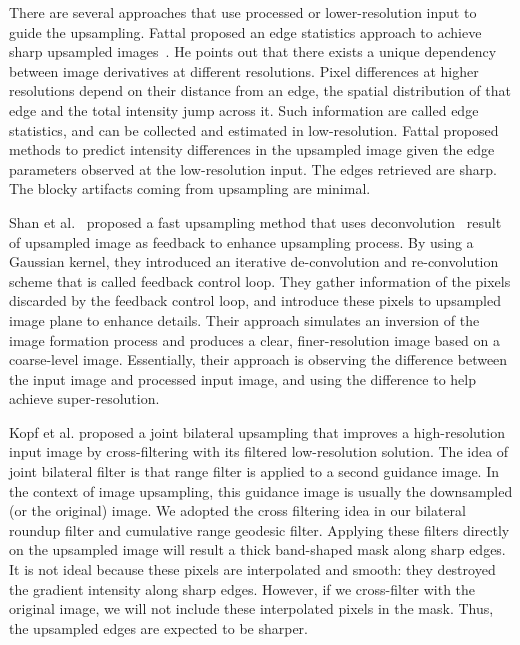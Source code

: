 There are several approaches that use processed or lower-resolution input to guide the upsampling. Fattal proposed an edge statistics approach to achieve sharp upsampled images~\cite{FAT:EdgeStatistics}. He points out that there exists a unique dependency between image derivatives at different resolutions. Pixel differences at higher resolutions depend on their distance from an edge, the spatial distribution of that edge and the total intensity jump across it. Such information are called edge statistics, and can be collected and estimated in low-resolution. Fattal proposed methods to predict intensity differences in the upsampled image given the edge parameters observed at the low-resolution input. The edges retrieved are sharp. The blocky artifacts coming from upsampling are minimal. 

Shan et al.~\cite{ Shan:fiu} proposed a fast upsampling method that uses deconvolution~\cite{Shan:2008} result of upsampled image as feedback to enhance upsampling process. By using a Gaussian kernel, they introduced an iterative de-convolution and re-convolution scheme that is called feedback control loop. They gather information of the pixels discarded by the feedback control loop, and introduce these pixels to upsampled image plane to enhance details. Their approach simulates an inversion of the image formation process and produces a clear, finer-resolution image based on a coarse-level image. Essentially, their approach is observing the difference between the input image and processed input image, and using the difference to help achieve super-resolution. 

Kopf et al. proposed a joint bilateral upsampling\cite{kopf:JBilateral} that improves a high-resolution input image by cross-filtering with its filtered low-resolution solution. The idea of joint bilateral filter is that range filter is applied to a second guidance image. In the context of image upsampling, this guidance image is usually the downsampled (or the original) image. We adopted the cross filtering idea in our bilateral roundup filter and cumulative range geodesic filter. Applying these filters directly on the upsampled image will result a thick band-shaped mask along sharp edges. It is not ideal because these pixels are interpolated and smooth: they destroyed the gradient intensity along sharp edges. However, if we cross-filter with the original image, we will not include these interpolated pixels in the mask. Thus, the upsampled edges are expected to be sharper.



